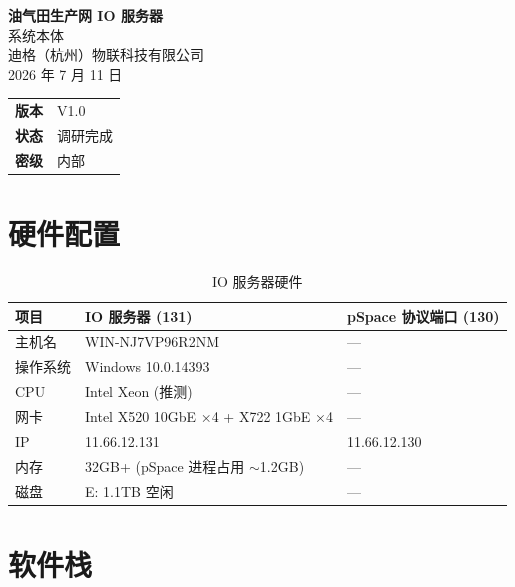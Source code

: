 \documentclass[12pt,a4paper]{ctexart}
\begin{document}
\begin{titlepage}
\centering
\vspace*{3cm}
{\Huge\bfseries 油气田生产网 IO 服务器}\\[0.5cm]
{\LARGE 系统本体}\\[2cm]
{\large 迪格（杭州）物联科技有限公司}\\[0.3cm]
{\large 2026 年 7 月 11 日}\\[1cm]
\begin{tabular}{rl}
\textbf{版本} & V1.0 \\
\textbf{状态} & 调研完成 \\
\textbf{密级} & 内部 \\
\end{tabular}
\end{titlepage}

\tableofcontents
\newpage

\section{硬件配置}

\begin{table}[H]\centering
\caption{IO 服务器硬件}
\begin{tabular}{p{3cm}p{5cm}p{5cm}}
\toprule
\textbf{项目} & \textbf{IO 服务器 (131)} & \textbf{pSpace 协议端口 (130)} \\
\midrule
主机名 & WIN-NJ7VP96R2NM & --- \\
操作系统 & Windows 10.0.14393 & --- \\
CPU & Intel Xeon (推测) & --- \\
网卡 & Intel X520 10GbE ×4 + X722 1GbE ×4 & --- \\
IP & 11.66.12.131 & 11.66.12.130 \\
内存 & 32GB+ (pSpace 进程占用 $\sim$1.2GB) & --- \\
磁盘 & E: 1.1TB 空闲 & --- \\
\bottomrule
\end{tabular}
\end{table}

\section{软件栈}
\end{document}
